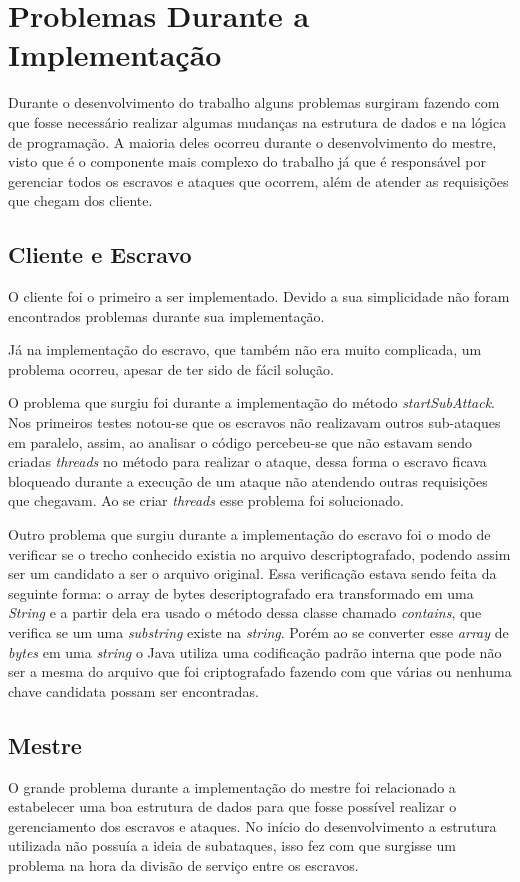 \documentclass[
	12pt,				%
    oneside,			%
	a4paper,			%
	english,			%
	brazil,				%
	]{abntex2}
\begin{document}
\section{Problemas Durante a Implementação}
Durante o desenvolvimento do trabalho alguns problemas surgiram fazendo com que fosse necessário realizar algumas mudanças
na estrutura de dados e na lógica de programação. A maioria deles ocorreu durante o desenvolvimento do mestre, visto que
é o componente mais complexo do trabalho já que é responsável por gerenciar todos os escravos e ataques que ocorrem, além de 
atender as requisições que chegam dos cliente. 


\subsection{Cliente e Escravo}
O cliente foi o primeiro a ser implementado. Devido a sua simplicidade não foram encontrados problemas durante sua implementação.

Já na implementação do escravo, que também não era muito complicada, um problema ocorreu, apesar de 
ter sido de fácil solução.

O problema que surgiu foi durante a implementação do método \textit{startSubAttack}. Nos primeiros testes notou-se que os escravos não realizavam outros sub-ataques em paralelo, assim, ao analisar o código percebeu-se que não estavam sendo criadas \textit{threads} no método para realizar o ataque, dessa forma o escravo ficava bloqueado durante a execução de um ataque não atendendo outras requisições que chegavam. Ao se criar \textit{threads} esse problema foi solucionado.

Outro problema que surgiu durante a implementação do escravo foi o modo de verificar se o trecho conhecido existia no arquivo
descriptografado, podendo assim ser um candidato a ser o arquivo original. Essa verificação estava sendo feita da seguinte
forma: o array de bytes descriptografado era transformado em uma \textit{String} e a partir dela era usado o método dessa classe chamado \textit{contains}, que verifica se um uma \textit{substring} existe na \textit{string}. Porém ao se converter esse \textit{array} de \textit{bytes} em uma \textit{string} o Java utiliza uma codificação padrão interna que pode não ser a
mesma do arquivo que foi criptografado fazendo com que várias ou nenhuma chave candidata possam ser encontradas.

\subsection{Mestre}
\label{sec:prob_mestre}
O grande problema durante a implementação do mestre foi relacionado a estabelecer uma boa estrutura de dados para que fosse
possível realizar o gerenciamento dos escravos e ataques. No início do desenvolvimento a estrutura utilizada não possuía a ideia de subataques, isso fez com que surgisse um problema na hora da divisão de serviço entre os escravos. 
\end{document}
